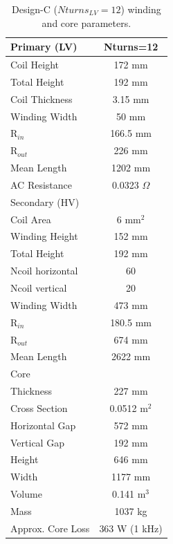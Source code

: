 \documentclass[a4paper, 11pt]{article} %
\begin{document}
\begin{table}[]
\begin{center}
\begin{tabular}{lc}
Primary (LV) & Nturns=12\\
\hline
Coil Height & 172 mm \\
Total Height & 192 mm \\
Coil Thickness & 3.15 mm\\
Winding Width & 50 mm \\
R$_{in}$ & 166.5 mm \\
R$_{out}$ & 226 mm \\
Mean Length & 1202 mm \\
AC Resistance & 0.0323 $\Omega$ \\
\hline
Secondary (HV) \\
Coil Area & 6 mm$^2$\\
Winding Height & 152 mm \\ 
Total Height & 192 mm \\
Ncoil horizontal & 60 \\
Ncoil vertical & 20 \\
Winding Width & 473 mm \\
R$_{in}$ & 180.5 mm \\
R$_{out}$ & 674 mm \\
Mean Length & 2622 mm \\
\hline
Core \\
Thickness & 227 mm \\
Cross Section & 0.0512 m$^2$\\
Horizontal Gap & 572 mm \\
Vertical Gap & 192 mm \\
Height & 646 mm \\
Width & 1177 mm \\
Volume & 0.141 m$^3$ \\
Mass & 1037 kg \\
\hline
Approx. Core Loss & 363 W (1 kHz) \\
\hline
\end{tabular} 
\end{center}
\caption{Design-C ($Nturns_{LV}=12$) winding and core parameters.}
\label{design_C}
\end{table}
\end{document}
